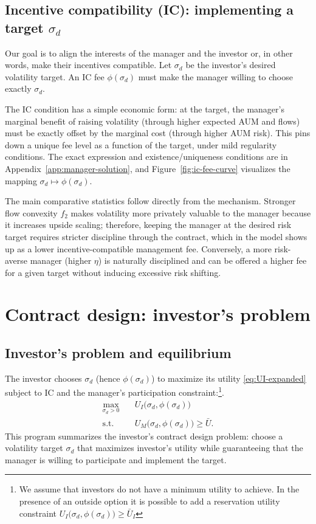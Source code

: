 \documentclass[11pt]{article}
\begin{document}
\subsection{Incentive compatibility (IC): implementing a target \texorpdfstring{$\sigma_d$}{sigma\_d}}
\label{subsec:IC}

Our goal is to align the interests of the manager and the investor or, in other words, make their incentives compatible. Let \(\sigma_d\) be the investor’s desired volatility target. An IC fee \(\phi(\sigma_d)\) must make the manager willing to choose exactly \(\sigma_d\).

The IC condition has a simple economic form: at the target, the manager’s marginal benefit of raising volatility (through higher expected AUM and flows) must be exactly offset by the marginal cost (through higher AUM risk). This pins down a unique fee level as a function of the target, under mild regularity conditions. The exact expression and existence/uniqueness conditions are in Appendix~\ref{app:manager-solution}, and Figure~\ref{fig:ic-fee-curve} visualizes the mapping $\sigma_d\mapsto \phi(\sigma_d)$.

The main comparative statistics follow directly from the mechanism. Stronger flow convexity $f_2$ makes volatility more privately valuable to the manager because it increases upside scaling; therefore, keeping the manager at the desired risk target requires stricter discipline through the contract, which in the model shows up as a lower incentive-compatible management fee. Conversely, a more risk-averse manager (higher $\eta$) is naturally disciplined and can be offered a higher fee for a given target without inducing excessive risk shifting.



\section{Contract design: investor’s problem}
\label{sec:contract}
\subsection{Investor’s problem and equilibrium}
\label{sec:investor}
The investor chooses \(\sigma_d\) (hence \(\phi(\sigma_d)\)) to maximize its utility \eqref{eq:UI-expanded} subject to IC and the manager’s participation constraint:\footnote{We assume that investors do not have a minimum utility to achieve. In the presence of an outside option it is possible to add a reservation utility constraint $U_I\big(\sigma_d,\phi(\sigma_d)\big) \geq \bar{U}_I$ }.
\begin{align}
\max_{\sigma_d>0}\quad & U_I\big(\sigma_d,\phi(\sigma_d)\big) \\
\text{s.t.}\quad & U_M\big(\sigma_d,\phi(\sigma_d)\big)\ge \bar U. \nonumber
\end{align}
This program summarizes the investor’s contract design problem: choose a volatility target $\sigma_d$ that maximizes investor's utility while guaranteeing that the manager is willing to participate and implement the target.
\end{document}
